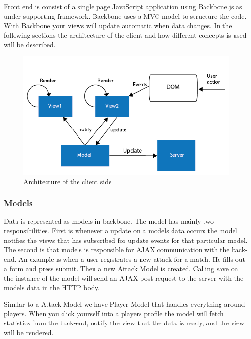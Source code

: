 Front end is consist of a single page JavaScript application using Backbone.js \footnotemark as under-supporting framework. Backbone uses a MVC model to structure the code. With Backbone your views will update automatic when data changes. In the following sections the architecture of the client and how different concepts is used will be described. 


\begin{figure}[ht!]
\centering
\includegraphics[width=150mm]{images/architecture/backbone_architecture.png}
\caption{Architecture of the client side}
\label{overflow}
\end{figure}

\subsubsection{Models}

Data is represented as models in backbone. The model has mainly two responsibilities. First is whenever a update on a models data occurs the model notifies the views that has subscribed for update events for that particular model. The second is that models is responsible for AJAX communication  with the back-end. An example is when a user registrates a new attack for a match. He fills out a form and press submit. Then a new Attack Model is created. Calling save on the instance of the model will send an AJAX post request to the server with the models data in the HTTP body.

Similar to a Attack Model we have Player Model that handles everything around players. When you click yourself into a players profile the model will fetch statistics from the back-end, notify the view that the data is ready, and the view will be rendered.

